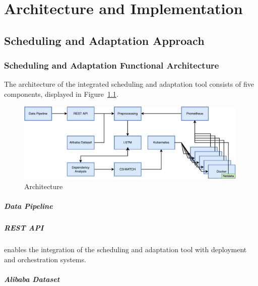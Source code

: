 \chapter{Architecture and Implementation}
\label{ch:architecture-and-implementation}

\section{Scheduling and Adaptation Approach}
\label{sec:scheduling-and-adaptation-approach-architecture}

  \subsection{Scheduling and Adaptation Functional Architecture}
  The architecture of the integrated \SAA{} scheduling and adaptation tool consists of five components, displayed in Figure~\ref{fig:data-cloud-architecture}.

  \begin{figure}
      \centering
      \includegraphics[width=0.99\textwidth]{figures/saa_diagram.pdf}
      \caption{\SAA Architecture}
      \label{fig:data-cloud-architecture}
  \end{figure}

  \paragraph{Data Pipeline}

  \paragraph{REST API} enables the integration of the \SAA{} scheduling and adaptation tool with deployment and orchestration systems. \cite{kimovskiBigDataPipeline2022}

  \paragraph{Alibaba Dataset}

